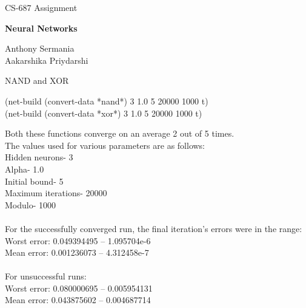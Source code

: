 \documentclass{article}
\begin{document}
  
  \begin{normalsize}
  \begin{flushleft}
  CS-687 Assignment
  \end{flushleft}
  \end{normalsize}
{\LARGE   \textbf{Neural Networks}}\\
\begin{small}
\begin{flushright}
Anthony Sermania\\
Aakarshika Priydarshi
\end{flushright}
\end{small}
  
 \begin{flushleft}
 \begin{Large}
 NAND and XOR\\
 \end{Large}
 \end{flushleft}
    
  \begin{flushleft}
  \begin{small}
(net-build (convert-data *nand*) 3 1.0 5 20000 1000 t)\\
(net-build (convert-data *xor*) 3 1.0 5 20000 1000 t)
  \end{small}
  \end{flushleft}
\begin{normalsize}
Both these functions converge on an average 2 out of 5 times.\\
The values used for various parameters are as follows: \\
Hidden neurons- 3\\
Alpha- 1.0\\
Initial bound- 5\\
Maximum iterations- 20000\\
Modulo- 1000\\\\
For the successfully converged run, the final iteration’s errors were in the range:\\
Worst error: 0.049394495 – 1.095704e-6 \\
Mean error: 0.001236073 – 4.312458e-7 \\\\
For unsuccessful runs:\\
Worst error: 0.080000695 – 0.005954131 \\
Mean error: 0.043875602 – 0.004687714 \\\\
\end{normalsize}
\end{document}
